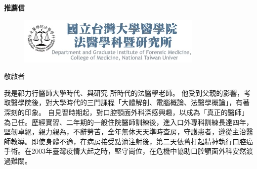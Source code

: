 \documentclass{letter}
\date{}
\begin{document}
\begin{letter}
{
\centering \Large \textbf{推薦信}%
}

\hfill
\begin{figure}%
    \includegraphics[width=0.2\textheight]{logo.png;jsessionid=9EB9B4FFBC92DB4866AAF9D856683DAC.png}
\end{figure}

\opening{敬啟者} %
\medskip 

\indent 我是祁力行醫師大學時代、與研究 所時代的法醫學老師。%
他受到父親的影響，考取醫學院後，對大學時代的三門課程「大體解剖、電腦概論、法醫學概論」，有著深刻的印象。
自見習時期起，對口腔顎面外科深感興趣，以成為「真正的醫師」為己任。歷經實習、二年期的一般住院醫師訓練後，進入口外專科訓練長達四年，堅韌卓絕，親力親為，不辭勞苦，全年無休天天準時查房，守護患者，遵從主治醫師教導。即使身體不適，在病房接受點滴注射後，第二天依舊打起精神執行口腔癌手術。在2003年臺灣疫情大起之時，堅守崗位，在危機中協助口腔顎面外科安然渡過難關。




\end{letter}
\end{document}
